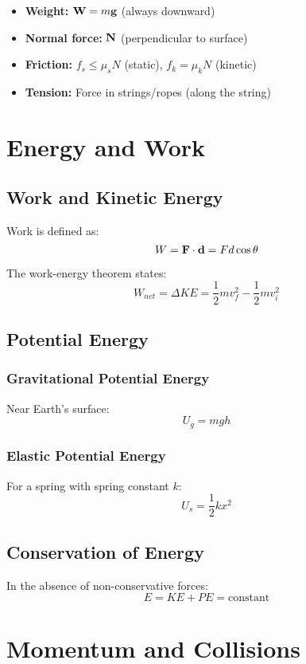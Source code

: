\documentclass[11pt]{book}
\begin{document}
\begin{itemize}
    \item \textbf{Weight:} $\mathbf{W} = m\mathbf{g}$ (always downward)
    \item \textbf{Normal force:} $\mathbf{N}$ (perpendicular to surface)
    \item \textbf{Friction:} $f_s \leq \mu_s N$ (static), $f_k = \mu_k N$ (kinetic)
    \item \textbf{Tension:} Force in strings/ropes (along the string)
\end{itemize}

\chapter{Energy and Work}

\section{Work and Kinetic Energy}

Work is defined as:
\[ W = \mathbf{F} \cdot \mathbf{d} = Fd\cos\theta \]

The work-energy theorem states:
\[ W_{net} = \Delta KE = \frac{1}{2}mv_f^2 - \frac{1}{2}mv_i^2 \]

\section{Potential Energy}

\subsection{Gravitational Potential Energy}
Near Earth's surface:
\[ U_g = mgh \]

\subsection{Elastic Potential Energy}
For a spring with spring constant $k$:
\[ U_s = \frac{1}{2}kx^2 \]

\section{Conservation of Energy}

In the absence of non-conservative forces:
\[ E = KE + PE = \text{constant} \]

\chapter{Momentum and Collisions}
\end{document}
